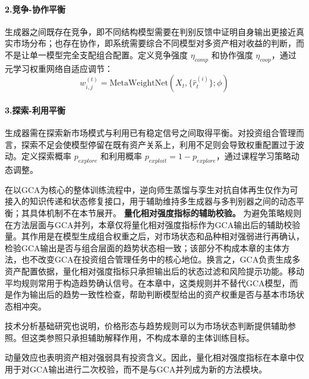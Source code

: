 \paragraph{2.竞争-协作平衡} 生成器之间既存在竞争，即不同结构模型需要在判别反馈中证明自身输出更接近真实市场分布；也存在协作，即系统需要综合不同模型对多资产相对收益的判断，而不是让单一模型完全支配组合配置。定义竞争强度 $\eta_{comp}$ 和协作强度 $\eta_{coop}$，通过元学习权重网络自适应调节：
\[
w_{i,j}^{(t)} = \text{MetaWeightNet}(X_t, \{\hat{r}_t^{(i)}\}; \phi)
\]

\paragraph{3.探索-利用平衡} 生成器需在探索新市场模式与利用已有稳定信号之间取得平衡。对投资组合管理而言，探索不足会使模型停留在既有资产关系上，利用不足则会导致权重配置过于波动。定义探索概率 $p_{explore}$ 和利用概率 $p_{exploit} = 1 - p_{explore}$，通过课程学习策略动态调整。

在以GCA为核心的整体训练流程中，逆向师生蒸馏与孪生对抗自体再生仅作为可接入的知识传递和状态修复接口，用于辅助维持多生成器与多判别器之间的动态平衡；其具体机制不在本节展开。
\label{sec:qr_gca}
\noindent\textbf{量化相对强度指标的辅助校验。} 为避免策略规则在方法层面与GCA并列，本章仅将量化相对强度指标作为GCA输出后的辅助校验量。其作用是在模型生成组合权重之后，对市场状态和品种相对强弱进行再确认，检验GCA输出是否与组合层面的趋势状态相一致；该部分不构成本章的主体方法，也不改变GCA在投资组合管理任务中的核心地位。换言之，GCA负责生成多资产配置依据，量化相对强度指标只承担输出后的状态过滤和风险提示功能。移动平均规则常用于构造趋势确认信号\cite{murphy1999technical}。在本章中，这类规则并不替代GCA模型，而是作为输出后的趋势一致性检查，帮助判断模型给出的资产权重是否与基本市场状态相冲突。

技术分析基础研究也说明，价格形态与趋势规则可以为市场状态判断提供辅助参照\cite{lo2000foundations}。但这类参照只承担辅助解释作用，不构成本章的主体训练目标。

动量效应也表明资产相对强弱具有投资含义\cite{jegadeesh1993returns}。因此，量化相对强度指标在本章中仅用于对GCA输出进行二次校验，而不是与GCA并列成为新的方法模块。

